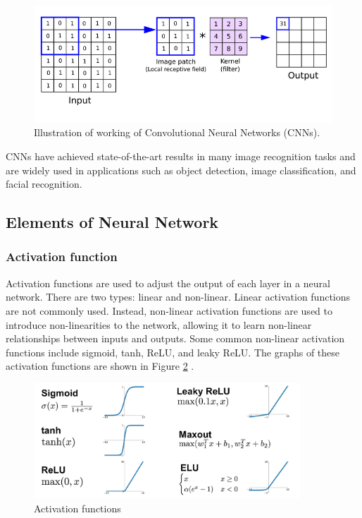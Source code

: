 \documentclass{report}
\begin{document}
	\begin{figure}[h!]
		\centering
		\includegraphics[width=0.7\columnwidth]{resources/chapter3/cnn2.png}
		\caption{Illustration of working of Convolutional Neural Networks (CNNs). \cite{reynolds2023convolutional}}
		\label{fig:CNN2}
	\end{figure}
	
	CNNs have achieved state-of-the-art results in many image recognition tasks and are widely used in applications such as object detection, image classification, and facial recognition.
	
	\subsection{Elements of Neural Network}
	\subsubsection{Activation function}
	
	Activation functions are used to adjust the output of each layer in a neural network. There are two types: linear and non-linear. Linear activation functions are not commonly used. Instead, non-linear activation functions are used to introduce non-linearities to the network, allowing it to learn non-linear relationships between inputs and outputs. Some common non-linear activation functions include sigmoid, tanh, ReLU, and leaky ReLU. The graphs of these activation functions are shown in Figure \ref{fig:Activation_functions} \cite{image2023, szandala2021review}.
	
	\begin{figure}[h!]
		\centering
		\includegraphics[width=100mm]{resources/chapter3/activation_functions.png}
		\caption{Activation functions}
		\label{fig:Activation_functions}
	\end{figure}
	
\end{document}
